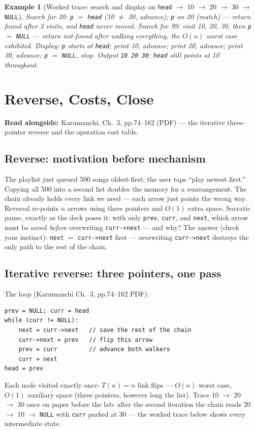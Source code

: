 \documentclass[11pt]{article}
\newtheorem{example}{Example}[section]
\begin{document}
\begin{example}[Worked trace: search and display on \texttt{head} $\to$ 10 $\to$ 20 $\to$ 30 $\to$ \texttt{NULL}]
Search for 20: \texttt{p} $=$ \texttt{head} (10 $\ne$ 20, advance); \texttt{p} on 20 (match) --- return found after 2 visits, and \texttt{head} never moved. Search for 99: visit 10, 20, 30, then \texttt{p} $=$ \texttt{NULL} --- return not-found after walking everything, the $O(n)$ worst case exhibited. Display: \texttt{p} starts at \texttt{head}; print 10, advance; print 20, advance; print 30, advance; \texttt{p} $=$ \texttt{NULL}, stop. Output \texttt{10 20 30}; \texttt{head} still points at 10 throughout.
\end{example}

\section{Reverse, Costs, Close}

\textbf{Read alongside:} Karumanchi, Ch.~3, pp.74--162 (PDF) --- the iterative three-pointer reverse and the operation cost table.

\subsection{Reverse: motivation before mechanism}

The playlist just queued 500 songs oldest-first; the user taps ``play newest first.'' Copying all 500 into a second list doubles the memory for a rearrangement. The chain already holds every link we need --- each arrow just points the wrong way. Reversal re-points $n$ arrows using three pointers and $O(1)$ extra space. Socratic pause, exactly as the deck poses it: with only \texttt{prev}, \texttt{curr}, and \texttt{next}, which arrow must be saved \emph{before} overwriting \texttt{curr->next} --- and why? The answer (check your instinct): \texttt{next} $=$ \texttt{curr->next} first --- overwriting \texttt{curr->next} destroys the only path to the rest of the chain.

\subsection{Iterative reverse: three pointers, one pass}

The loop (Karumanchi Ch.~3, pp.74--162 PDF):
{\footnotesize
\begin{verbatim}
prev = NULL; curr = head
while (curr != NULL):
    next = curr->next   // save the rest of the chain
    curr->next = prev   // flip this arrow
    prev = curr         // advance both walkers
    curr = next
head = prev
\end{verbatim}
}
Each node visited exactly once: $T(n) = n$ link flips --- $O(n)$ worst case, $O(1)$ auxiliary space (three pointers, however long the list). Trace 10 $\to$ 20 $\to$ 30 once on paper before the lab: after the second iteration the chain reads 20 $\to$ 10 $\to$ \texttt{NULL} with \texttt{curr} parked at 30 --- the worked trace below shows every intermediate state.
\end{document}
